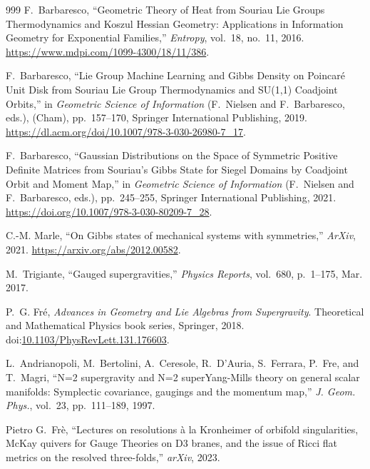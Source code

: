 \documentclass[10pt,a4paper]{article}
\begin{document}
\begin{thebibliography}{999}
F.~{B}arbaresco, ``{G}eometric {T}heory of {H}eat from {S}ouriau {L}ie {G}roups
  {T}hermodynamics and {K}oszul {H}essian {G}eometry: Applications in
  {I}nformation {G}eometry for {E}xponential {F}amilies,'' {\em Entropy},
  vol.~18, no.~11, 2016.
\newblock \url{https://www.mdpi.com/1099-4300/18/11/386}.

F.~Barbaresco, ``Lie {G}roup {M}achine {L}earning and {G}ibbs {D}ensity on
  {P}oincar{\'e} {U}nit {D}isk from {S}ouriau {L}ie {G}roup {T}hermodynamics
  and {SU(1,1)} {C}oadjoint {O}rbits,'' in {\em Geometric Science of
  Information} (F.~Nielsen and F.~Barbaresco, eds.), (Cham), pp.~157--170,
  Springer International Publishing, 2019.
\newblock \url{https://dl.acm.org/doi/10.1007/978-3-030-26980-7_17}.

F.~Barbaresco, ``{G}aussian {D}istributions on the {S}pace of {S}ymmetric
  {P}ositive {D}efinite {M}atrices from {S}ouriau's {G}ibbs {S}tate for
  {S}iegel {D}omains by {C}oadjoint {O}rbit and {M}oment {M}ap,'' in {\em
  Geometric Science of Information} (F.~Nielsen and F.~Barbaresco, eds.),
  pp.~245--255, Springer International Publishing, 2021.
\newblock \url{https://doi.org/10.1007/978-3-030-80209-7_28}.

C.-M. {M}arle, ``{O}n {G}ibbs states of mechanical systems with symmetries,''
  {\em ArXiv}, 2021.
\newblock \url{https://arxiv.org/abs/2012.00582}.

M.~Trigiante, ``Gauged supergravities,'' {\em Physics Reports}, vol.~680,
  p.~1–175, Mar. 2017.

P.~G. Fr{\'e}, {\em {Advances in Geometry and Lie Algebras from Supergravity}}.
\newblock Theoretical and Mathematical Physics book series, Springer, 2018.
\newblock
  doi:\href{https://doi.org/10.1103/PhysRevLett.131.176603}{10.1103/PhysRevLett.131.176603}.

L.~Andrianopoli, M.~Bertolini, A.~Ceresole, R.~D'Auria, S.~Ferrara, P.~Fre, and
  T.~Magri, ``{N=2 supergravity and N=2 superYang-Mills theory on general
  scalar manifolds: Symplectic covariance, gaugings and the momentum map},''
  {\em J. Geom. Phys.}, vol.~23, pp.~111--189, 1997.

{P}ietro {G}.~{F}r\`e, ``{L}ectures on resolutions \`a la {K}ronheimer of
  orbifold singularities, {M}c{K}ay quivers for {G}auge {T}heories on {D3}
  branes, and the issue of {R}icci flat metrics on the resolved three-folds,''
  {\em arXiv}, 2023.


\end{thebibliography}
\end{document}
